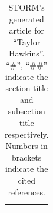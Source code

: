 \documentclass[11pt]{article}
\newcommand{\system}[0]{STORM\xspace}
\begin{document}
\begin{longtable}{p{\textwidth}}
\bottomrule
\caption{\system's generated article for ``Taylor Hawkins''. ``\#'', ``\#\#'' indicate the section title and subsection title respectively. Numbers in brackets indicate the cited references.}
\label{table:example}
\end{longtable}

\end{document}
